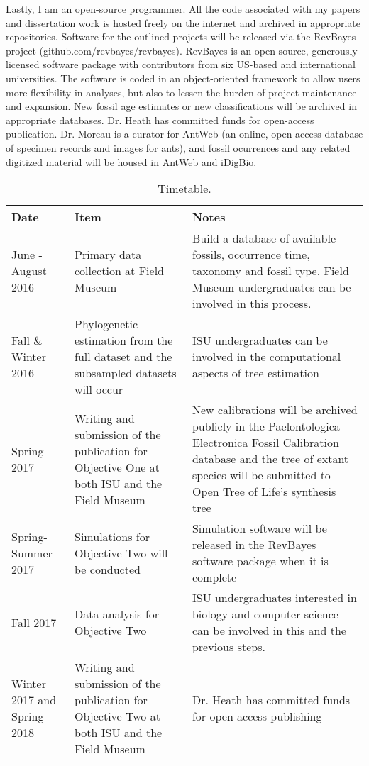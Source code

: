 \documentclass[]{article}
\begin{document}
Lastly, I am an open-source programmer. All the code associated with my papers and dissertation work is hosted freely on the internet and archived in appropriate repositories. Software for the outlined projects will be released via the RevBayes project (github.com/revbayes/revbayes). RevBayes is an open-source, generously-licensed software package with contributors from six US-based and international universities. The software is coded in an object-oriented framework to allow users more flexibility in analyses, but also to lessen the burden of project maintenance and expansion. New fossil age estimates or new classifications will be archived in appropriate databases. Dr. Heath has committed funds for open-access publication. Dr. Moreau is a curator for AntWeb (an online, open-access database of specimen records and images for ants), and fossil ocurrences and any related digitized material will be housed in AntWeb and iDigBio. \par
	

\begin{table}
\centering
\begin{tabular}{l | p{5cm} | p{5cm}}
Date & Item & Notes \\\hline
June - August 2016 &  Primary data collection at Field Museum & Build a database of available fossils, occurrence time, taxonomy and fossil type. Field Museum undergraduates can be involved in this process.  \\\hline
Fall \& Winter 2016 & Phylogenetic estimation from the full dataset and the subsampled datasets will occur  & ISU undergraduates can be involved in the computational aspects of tree estimation  \\\hline
Spring 2017 & Writing and submission of the publication for Objective One at both ISU and the Field Museum  & New calibrations will be archived publicly in the Paelontologica Electronica Fossil Calibration database and the tree of extant species will be submitted to Open Tree of Life's synthesis tree  \\\hline 
Spring-Summer 2017 & Simulations for Objective Two will be conducted & Simulation software will be released in the RevBayes software package when it is complete \\\hline
Fall 2017 & Data analysis for Objective Two & ISU undergraduates interested in biology and computer science can be involved in this and the previous steps. \\\hline
Winter 2017 and Spring 2018 & Writing and submission of the publication for Objective Two at both ISU and the Field Museum  & Dr. Heath has committed funds for open access publishing \


\end{tabular}
\caption{\label{tab:widgets}Timetable.}
\end{table}	



  
	
\end{document}
